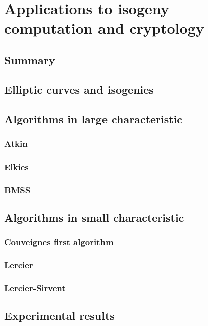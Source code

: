 \part{Applications to isogeny computation and cryptology}

\chapter{Summary}


\chapter{Elliptic curves and isogenies}


\chapter{Algorithms in large characteristic}
\section{Atkin}
\section{Elkies}
\section{BMSS}

\chapter{Algorithms in small characteristic}

\section{Couveignes first algorithm}
\section{Lercier}
\section{Lercier-Sirvent}






\chapter{Experimental results}




%

